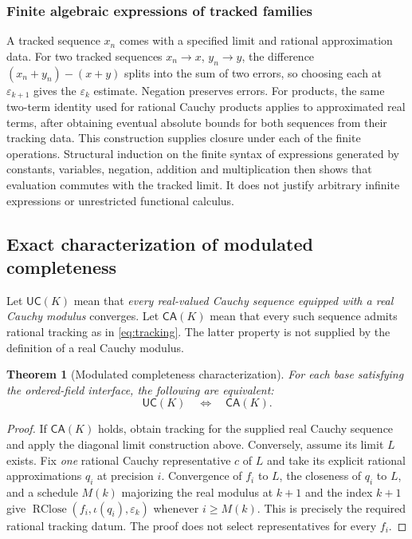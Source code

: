 \documentclass[11pt,reqno]{amsart}
\newtheorem{theorem}{Theorem}[section]
\theoremstyle{definition}\newtheorem{definition}[theorem]{Definition}
\theoremstyle{remark}\newtheorem{remark}[theorem]{Remark}
\newcommand{\eps}{\varepsilon}
\begin{document}
\subsubsection*{Finite algebraic expressions of tracked families}\label{supp:13-3}
A tracked sequence $x_n$ comes with a specified limit and rational approximation data. For two tracked sequences $x_n\to x$, $y_n\to y$, the difference $(x_n+y_n)-(x+y)$ splits into the sum of two errors, so choosing each at $\eps_{k+1}$ gives the $\eps_k$ estimate. Negation preserves errors. For products, the same two-term identity used for rational Cauchy products applies to approximated real terms, after obtaining eventual absolute bounds for both sequences from their tracking data. This construction supplies closure under each of the finite operations. Structural induction on the finite syntax of expressions generated by constants, variables, negation, addition and multiplication then shows that evaluation commutes with the tracked limit. It does not justify arbitrary infinite expressions or unrestricted functional calculus.
\medskip

\subsection{Exact characterization of modulated completeness}\label{main:sub-48}
Let $\mathsf{UC}(K)$ mean that \emph{every real-valued Cauchy sequence equipped with a real Cauchy modulus} converges. Let $\mathsf{CA}(K)$ mean that every such sequence admits rational tracking as in \eqref{eq:tracking}. The latter property is not supplied by the definition of a real Cauchy modulus.

\begin{theorem}[Modulated completeness characterization]\label{thm:uc}
For each base satisfying the ordered-field interface, the following are equivalent:
\[\mathsf{UC}(K)\quad\Longleftrightarrow\quad\mathsf{CA}(K).
\]
\end{theorem}
\begin{proof}
If $\mathsf{CA}(K)$ holds, obtain tracking for the supplied real Cauchy sequence and apply the diagonal limit construction above. Conversely, assume its limit $L$ exists. Fix \emph{one} rational Cauchy representative $c$ of $L$ and take its explicit rational approximations $q_i$ at precision $i$. Convergence of $f_i$ to $L$, the closeness of $q_i$ to $L$, and a schedule $M(k)$ majorizing the real modulus at $k+1$ and the index $k+1$ give $\operatorname{RClose}(f_i,\iota(q_i),\eps_k)$ whenever $i\ge M(k)$. This is precisely the required rational tracking datum. The proof does not select representatives for every $f_i$.
\end{proof}
\end{document}

